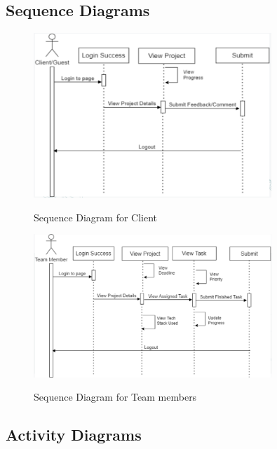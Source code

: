 \FloatBarrier
 
\subsection{Sequence Diagrams}

\begin{figure}[!htbp]
    \centering
    \includegraphics[width = 0.8\textwidth]{seqDgmClnt.png}\\[0.1in]
    \caption{Sequence Diagram for Client}
    \label{fig:my_label}
\end{figure}

\begin{figure}[h]
    \centering
    \includegraphics[width = 0.8\textwidth]{seqDiagramTeamMem.png}\\[0.1in]
    \caption{Sequence Diagram for Team members}
    \label{fig:my_label}
\end{figure}


\FloatBarrier

\subsection{Activity Diagrams}

